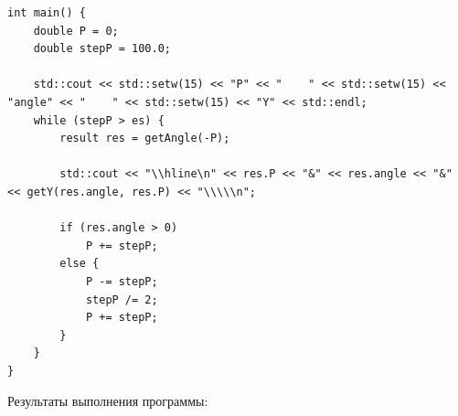 \documentclass[a4paper,14pt]{extarticle}
\begin{document}
\begin{enumerate}[1. ]
\begin{verbatim}
int main() {
    double P = 0;
    double stepP = 100.0;

    std::cout << std::setw(15) << "P" << "    " << std::setw(15) << "angle" << "    " << std::setw(15) << "Y" << std::endl;
    while (stepP > es) {
        result res = getAngle(-P);
        
        std::cout << "\\hline\n" << res.P << "&" << res.angle << "&"  << getY(res.angle, res.P) << "\\\\\n";

        if (res.angle > 0)
            P += stepP;
        else {
            P -= stepP;
            stepP /= 2;
            P += stepP;
        } 
    }
}
    \end{verbatim}
          Результаты выполнения программы:


\end{enumerate}
\end{document}
